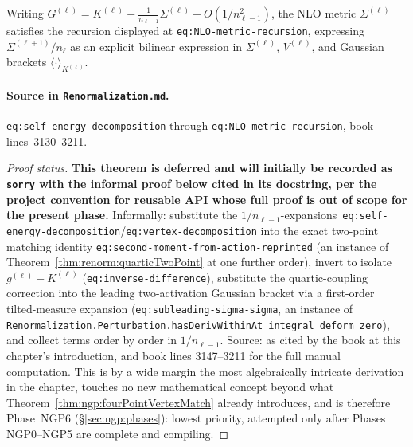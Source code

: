 \begin{theorem}
\label{thm:ngp:nloMetricRecursion}
Writing $G^{(\ell)}=K^{(\ell)}+\tfrac1{n_{\ell-1}}\Sigma^{(\ell)}+O(1/n_{\ell-1}^2)$, the NLO metric
$\Sigma^{(\ell)}$ satisfies the recursion displayed at \texttt{eq:NLO-metric-recursion}, expressing
$\Sigma^{(\ell+1)}/n_\ell$ as an explicit bilinear expression in $\Sigma^{(\ell)}$, $V^{(\ell)}$,
and Gaussian brackets $\langle\cdot\rangle_{K^{(\ell)}}$.

\paragraph{Source in \texttt{Renormalization.md}.}
\texttt{eq:self-energy-decomposition} through \texttt{eq:NLO-metric-recursion}, book
lines~3130--3211.
\end{theorem}

\begin{proof}[Proof status]
\textbf{This theorem is deferred and will initially be recorded as \texttt{sorry} with the
informal proof below cited in its docstring, per the project convention for reusable API whose
full proof is out of scope for the present phase.} Informally: substitute the
$1/n_{\ell-1}$-expansions~\texttt{eq:self-energy-decomposition}/\texttt{eq:vertex-decomposition}
into the exact two-point matching identity
\texttt{eq:second-moment-from-action-reprinted} (an instance of
Theorem~\ref{thm:renorm:quarticTwoPoint} at one further order), invert to isolate
$g^{(\ell)}-K^{(\ell)}$ (\texttt{eq:inverse-difference}), substitute the quartic-coupling
correction into the leading two-activation Gaussian bracket via a first-order tilted-measure
expansion (\texttt{eq:subleading-sigma-sigma}, an instance of
\texttt{Renormalization.Perturbation.hasDerivWithinAt\_integral\_deform\_zero}), and collect terms
order by order in $1/n_{\ell-1}$. Source: \cite{Yaida2019} as cited by the book at this chapter's
introduction, and book lines 3147--3211 for the full manual computation. This is by a wide margin
the most algebraically intricate derivation in the chapter, touches no new mathematical concept
beyond what Theorem~\ref{thm:ngp:fourPointVertexMatch} already introduces, and is therefore
Phase~NGP6 (\S\ref{sec:ngp:phases}): lowest priority, attempted only after Phases NGP0--NGP5 are
complete and compiling.
\end{proof}

